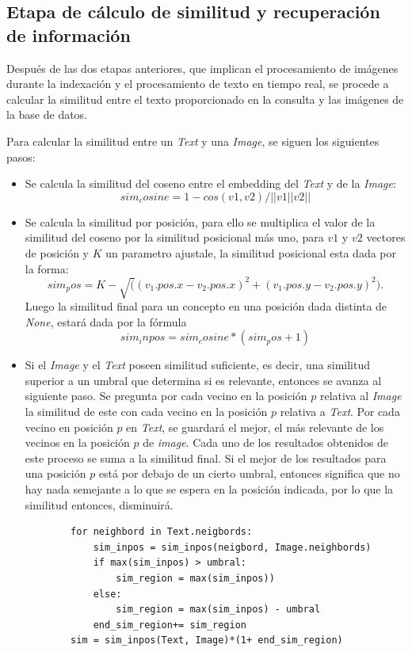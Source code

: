 \subsection{Etapa de cálculo de similitud y recuperación de información}

Después de las dos etapas anteriores, que implican el procesamiento de imágenes durante la indexación y el procesamiento de texto en tiempo real, se procede a calcular la similitud entre el texto proporcionado en la consulta y las imágenes de la base de datos.

Para calcular la similitud entre un \textit{Text} y una \textit{Image}, se siguen los siguientes pasos:
\begin{itemize}

    \item  Se calcula la similitud del coseno entre el embedding del \textit{Text} y de la \textit{Image}: 
    \[sim_cosine = 1- cos(v1,v2)/||v1||v2||\]

    \item  Se calcula la similitud por posici\'on, para ello se multiplica el valor de la similitud del coseno por la similitud posicional m\'as uno, para $v1$ y $v2$ vectores de posici\'on y $K$ un parametro ajustale, la similitud posicional esta dada por la forma: 
        \[sim_pos = K- \sqrt((v_1.pos.x - v_2.pos.x)^2+(v_1.pos.y - v_2.pos.y)^2).\]
    Luego la similitud final para un concepto en una posici\'on dada distinta de \textit{None}, estar\'a dada por la f\'ormula
            \[sim_inpos = sim_cosine *(sim_pos+1)\]
    
    \item Si el \textit{Image} y el \textit{Text} poseen similitud suficiente, es decir, una similitud superior a un umbral que determina si es relevante, entonces se avanza al siguiente paso. Se pregunta por cada vecino en la posici\'on $p$ relativa al \textit{Image} la similitud de este con cada vecino en la posición $p$ relativa a \textit{Text}. Por cada vecino en posici\'on $p$ en \textit{Text}, se guardar\'a el mejor, el m\'as relevante de los vecinos en la posici\'on $p$ de \textit{image}. Cada uno de los resultados obtenidos de este proceso se suma a la similitud final. Si el mejor de los resultados para una posición $p$ está por debajo de un cierto umbral, entonces significa que no hay nada semejante a lo que se espera en la posición indicada, por lo que la similitud entonces, disminuirá.

    \begin{verbatim}
        for neighbord in Text.neigbords:
            sim_inpos = sim_inpos(neigbord, Image.neighbords)
            if max(sim_inpos) > umbral:
                sim_region = max(sim_inpos))
            else:
                sim_region = max(sim_inpos) - umbral
            end_sim_region+= sim_region
        sim = sim_inpos(Text, Image)*(1+ end_sim_region)
    \end{verbatim}
            

\end{itemize}
